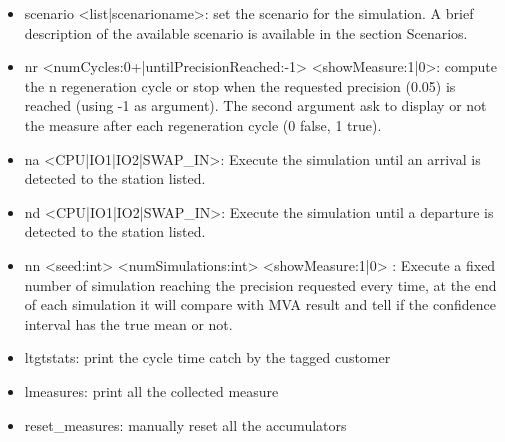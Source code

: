 \documentclass[12pt,a4paper]{article}
\begin{document}
\begin{itemize}
    \item scenario <list|scenarioname>: set the scenario for the simulation. A brief description of the available scenario is available in the section Scenarios.
    \item nr <numCycles:0+|untilPrecisionReached:-1> <showMeasure:1|0>: compute the n regeneration cycle or stop when the requested precision (0.05) is reached (using -1 as argument). The second argument ask to display or not the measure after each regeneration cycle (0 false, 1 true).
    \item na <CPU|IO1|IO2|SWAP\_IN>: Execute the simulation until an arrival is detected to the station listed.
    \item nd <CPU|IO1|IO2|SWAP\_IN>: Execute the simulation until a departure is detected to the station listed.
    \item nn <seed:int> <numSimulations:int> <showMeasure:1|0> : Execute a fixed number of simulation reaching the precision requested every time, at the end of each simulation it will compare with MVA result and tell if the confidence interval has the true mean or not.
    \item ltgtstats: print the cycle time catch by the tagged customer
    \item lmeasures: print all the collected measure
    \item reset\_measures: manually reset all the accumulators

\end{itemize}
\end{document}
